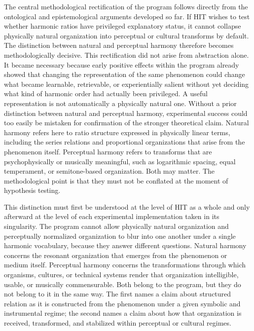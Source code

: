 The central methodological rectification of the program follows directly from the ontological and epistemological arguments developed so far. If HIT wishes to test whether harmonic ratios have privileged explanatory status, it cannot collapse physically natural organization into perceptual or cultural transforms by default. The distinction between natural and perceptual harmony therefore becomes methodologically decisive. This rectification did not arise from abstraction alone. It became necessary because early positive effects within the program already showed that changing the representation of the same phenomenon could change what became learnable, retrievable, or experientially salient without yet deciding what kind of harmonic order had actually been privileged. A useful representation is not automatically a physically natural one. Without a prior distinction between natural and perceptual harmony, experimental success could too easily be mistaken for confirmation of the stronger theoretical claim. Natural harmony refers here to ratio structure expressed in physically linear terms, including the series relations and proportional organizations that arise from the phenomenon itself. Perceptual harmony refers to transforms that are psychophysically or musically meaningful, such as logarithmic spacing, equal temperament, or semitone-based organization. Both may matter. The methodological point is that they must not be conflated at the moment of hypothesis testing.

This distinction must first be understood at the level of HIT as a whole and only afterward at the level of each experimental implementation taken in its singularity. The program cannot allow physically natural organization and perceptually normalized organization to blur into one another under a single harmonic vocabulary, because they answer different questions. Natural harmony concerns the resonant organization that emerges from the phenomenon or medium itself. Perceptual harmony concerns the transformations through which organisms, cultures, or technical systems render that organization intelligible, usable, or musically commensurable. Both belong to the program, but they do not belong to it in the same way. The first names a claim about structured relation as it is constructed from the phenomenon under a given symbolic and instrumental regime; the second names a claim about how that organization is received, transformed, and stabilized within perceptual or cultural regimes.

